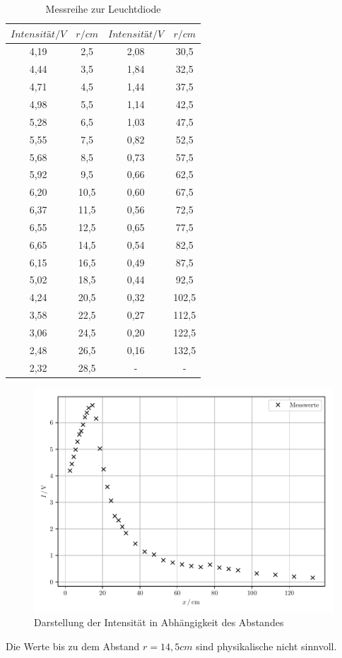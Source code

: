 \begin{table}[H]
\centering
\caption{Messreihe zur Leuchtdiode}
\label{tab:3}
 \begin{tabular}{c c| c c}
  \toprule
     $Intensität / V$ & $r / cm$ &  $Intensität / V$ & $r / cm$  \\
  \midrule
  4,19 & 2,5 & 2,08 & 30,5  \\
  4,44 & 3,5 & 1,84 & 32,5  \\
  4,71 & 4,5 & 1,44 & 37,5  \\
  4,98 & 5,5 & 1,14 & 42,5  \\
  5,28 & 6,5 & 1,03 & 47,5  \\
  5,55 & 7,5 & 0,82 & 52,5  \\
  5,68 & 8,5 & 0,73 & 57,5  \\
  5,92 & 9,5 & 0,66 & 62,5  \\
  6,20 & 10,5& 0,60 & 67,5  \\
  6,37 & 11,5& 0,56 & 72,5  \\
  6,55 & 12,5& 0,65 & 77,5  \\
  6,65 & 14,5& 0,54 & 82,5  \\
  6,15 & 16,5& 0,49 & 87,5  \\
  5,02 & 18,5& 0,44 & 92,5  \\
  4,24 & 20,5& 0,32 & 102,5 \\
  3,58 & 22,5& 0,27 & 112,5 \\
  3,06 & 24,5& 0,20 & 122,5 \\
  2,48 & 26,5& 0,16 & 132,5 \\
  2,32 & 28,5&   -  &  -    \\
  \bottomrule
\end{tabular}
\end{table}

\begin{figure}[H]
  \centering
	\includegraphics[width=\textwidth]{plot1.pdf}
  \caption{Darstellung der Intensität in Abhängigkeit des Abstandes}
  \label{abb:?}
\end{figure}

Die Werte bis zu dem Abstand $r = 14,5 cm$ sind physikalische nicht sinnvoll.
